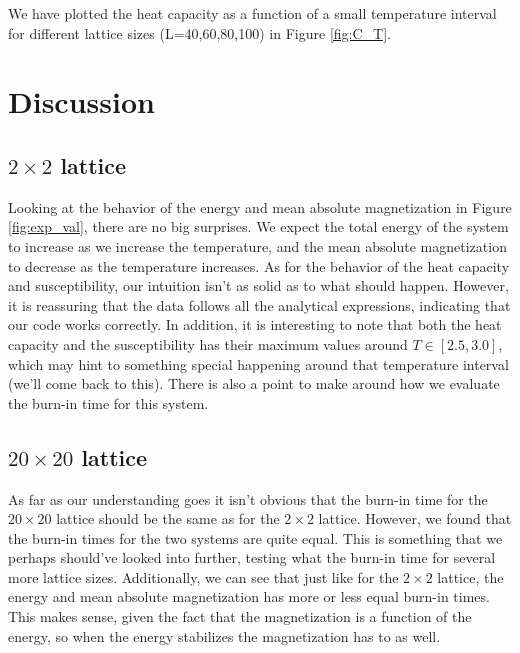 \documentclass{article}
\begin{document}
\begin{multicols}{2}
We have plotted the heat capacity as a function of a small temperature interval for different lattice sizes (L=40,60,80,100) in Figure \ref{fig:C_T}. 

\section{Discussion}

\subsection{$2\times 2$ lattice}

Looking at the behavior of the energy and mean absolute magnetization in Figure \ref{fig:exp_val}, there are no big surprises. We expect the total energy of the system to increase as we increase the temperature, and the mean absolute magnetization to decrease as the temperature increases. As for the behavior of the heat capacity and susceptibility, our intuition isn't as solid as to what should happen. However, it is reassuring that the data follows all the analytical expressions, indicating that our code works correctly. In addition, it is interesting to note that both the heat capacity and the susceptibility has their maximum values around $T\in[2.5, 3.0]$, which may hint to something special happening around that temperature interval (we'll come back to this). There is also a point to make around how we evaluate the burn-in time for this system. 

\subsection{$20\times 20$ lattice}

As far as our understanding goes it isn't obvious that the burn-in time for the $20 \times 20$ lattice should be the same as for the $2 \times 2$ lattice. However, we found that the burn-in times for the two systems are quite equal. This is something that we perhaps should've looked into further, testing what the burn-in time for several more lattice sizes.  Additionally, we can see that just like for the $2 \times 2$ lattice, the energy and mean absolute magnetization has more or less equal burn-in times. This makes sense, given the fact that the magnetization is a function of the energy, so when the energy stabilizes the magnetization has to as well. 


\end{multicols}
\end{document}
